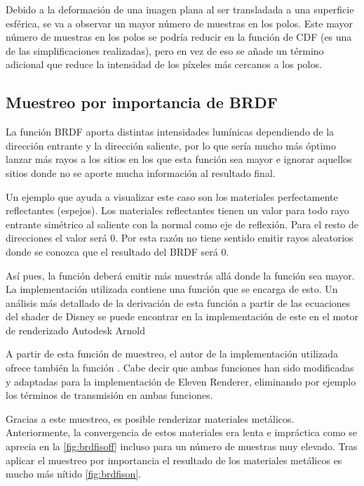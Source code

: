 Debido a la deformación de una imagen plana al ser transladada a una superficie esférica, se va a observar un mayor número de muestras en los polos. Este mayor número de muestras en los polos se podría reducir en la función de CDF (es una de las simplificaciones realizadas), pero en vez de eso se añade un término adicional  que reduce la intensidad de los píxeles más cercanos a los polos.


\subsection{Muestreo por importancia de BRDF}

La función BRDF aporta distintas intensidades lumínicas dependiendo de la dirección entrante y la dirección saliente, por lo que sería mucho más óptimo lanzar más rayos a los sitios en los que esta función sea mayor e ignorar aquellos sitios donde no se aporte mucha información al resultado final.

Un ejemplo que ayuda a visualizar este caso son los materiales perfectamente reflectantes (espejos). Los materiales reflectantes tienen un valor  para todo rayo entrante simétrico al saliente con la normal como eje de reflexión. Para el resto de direcciones el valor será 0. Por esta razón no tiene sentido emitir rayos aleatorios donde se conozca que el resultado del BRDF será 0.

Así pues, la función  deberá emitir más muestrás allá donde la función  sea mayor. La implementación utilizada contiene una función  que se encarga de esto. Un análisis más detallado de la derivación de esta función a partir de las ecuaciones del shader de Disney se puede encontrar en la implementación de este en el motor de renderizado Autodesk Arnold \cite{arnoldimplementation}

A partir de esta función de muestreo, el autor de la implementación utilizada ofrece también la función . Cabe decir que ambas funciones han sido modificadas y adaptadas para la implementación de Eleven Renderer, eliminando por ejemplo los términos de transmisión en ambas funciones.

Gracias a este muestreo, es posible renderizar materiales metálicos. Anteriormente, la convergencia de estos materiales era lenta e impráctica como se aprecia en la \autoref{fig:brdfisoff} incluso para un número de muestras muy elevado. Tras aplicar el muestreo por importancia el resultado de los materiales metálicos es mucho más nítido \autoref{fig:brdfison}.

